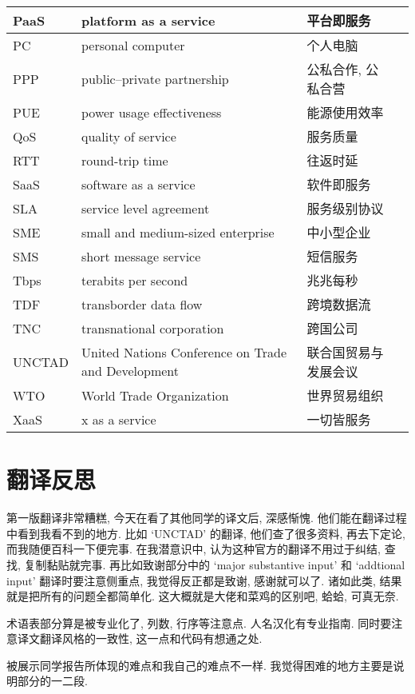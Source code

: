 \documentclass[a4paper, UTF8, 12pt]{article}
\begin{document}
\begin{longtable}{m{2cm}m{3cm}m{3cm}m{4cm}}
    \hline
    PaaS & platform as a service & 平台即服务 & \\
    \hline
    PC & personal computer & 个人电脑 & \\
    \hline
    PPP & public–private partnership & 公私合作, 公私合营 & \\
    \hline
    PUE & power usage effectiveness & 能源使用效率 & \\
    \hline
    QoS & quality of service & 服务质量 & \\
    \hline
    RTT & round-trip time & 往返时延 & \\
    \hline
    SaaS & software as a service & 软件即服务 & \\
    \hline
    SLA & service level agreement & 服务级别协议 & \\ 
    \hline
    SME & small and medium-sized enterprise & 中小型企业 & \\
    \hline
    SMS & short message service & 短信服务 & \\
    \hline
    Tbps & terabits per second & 兆兆每秒 & \\
    \hline
    TDF & transborder data flow & 跨境数据流 & \\ 
    \hline
    TNC & transnational corporation & 跨国公司 & \\
    \hline
    UNCTAD & United Nations Conference on Trade and Development & 联合国贸易与发展会议 & \\
    \hline
    WTO & World Trade Organization & 世界贸易组织 & \\
    \hline
    XaaS & x as a service & 一切皆服务 & \\
    \hline
\end{longtable}

\section{翻译反思}

第一版翻译非常糟糕, 今天在看了其他同学的译文后, 深感惭愧. 他们能在翻译过程中看到我看不到的地方. 比如 `UNCTAD' 的翻译, 他们查了很多资料, 再去下定论, 而我随便百科一下便完事. 在我潜意识中, 认为这种官方的翻译不用过于纠结, 查找, 复制黏贴就完事. 再比如致谢部分中的 `major substantive input' 和 `addtional input' 翻译时要注意侧重点, 我觉得反正都是致谢, 感谢就可以了. 诸如此类, 结果就是把所有的问题全都简单化. 这大概就是大佬和菜鸡的区别吧, 蛤蛤, 可真无奈.

术语表部分算是被专业化了, 列数, 行序等注意点. 人名汉化有专业指南. 同时要注意译文翻译风格的一致性, 这一点和代码有想通之处.

被展示同学报告所体现的难点和我自己的难点不一样. 我觉得困难的地方主要是说明部分的一二段.  
\end{document}

